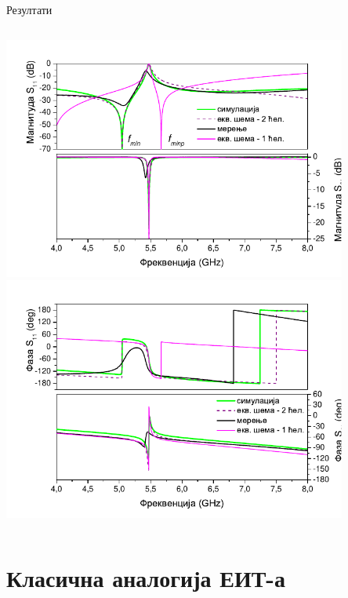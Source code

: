 \documentclass{beamer}
\begin{document}
\begin{frame}[t]{Резултати}
\begin{columns}[c]
        \includegraphics[width=0.85\textwidth]{sl_ekv/fig10a}
        \includegraphics[width=0.85\textwidth]{sl_ekv/fig10b}

    \end{columns}
\end{frame}

\section{Класична аналогија ЕИТ-а}
\end{document}
